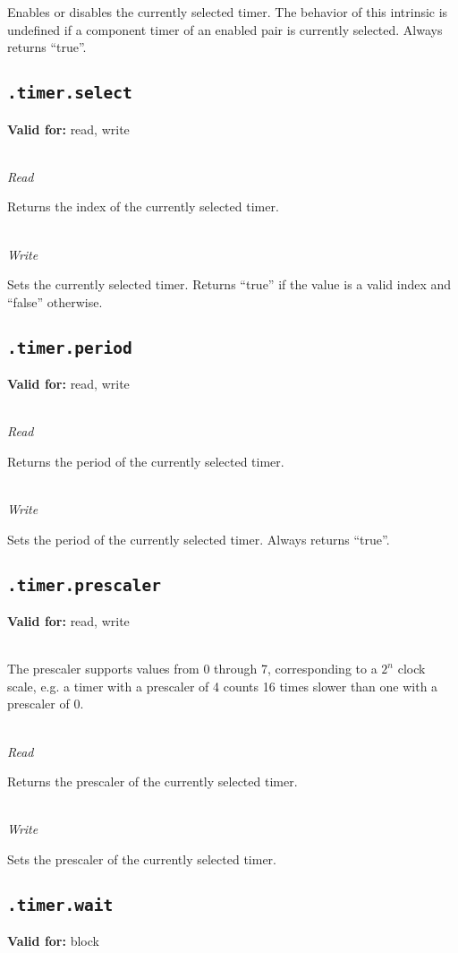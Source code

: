 \documentclass{article}
\begin{document}
Enables or disables the currently selected timer. The behavior of this intrinsic is undefined if a component timer of an enabled pair is currently selected. Always returns ``true''.

\subsection{\texttt{.timer.select}}
\textbf{Valid for:} read, write

~\\
\textit{Read}

Returns the index of the currently selected timer.

~\\
\textit{Write}

Sets the currently selected timer. Returns ``true'' if the value is a valid index and ``false'' otherwise.

\subsection{\texttt{.timer.period}}
\textbf{Valid for:} read, write

~\\
\textit{Read}

Returns the period of the currently selected timer.

~\\
\textit{Write}

Sets the period of the currently selected timer. Always returns ``true''.

\subsection{\texttt{.timer.prescaler}}
\textbf{Valid for:} read, write

~\\
The prescaler supports values from 0 through 7, corresponding to a $2^n$ clock scale, e.g. a timer with a prescaler of 4 counts 16 times slower than one with a prescaler of 0.

~\\
\textit{Read}

Returns the prescaler of the currently selected timer.

~\\
\textit{Write}

Sets the prescaler of the currently selected timer.

\subsection{\texttt{.timer.wait}}
\textbf{Valid for:} block
\end{document}
